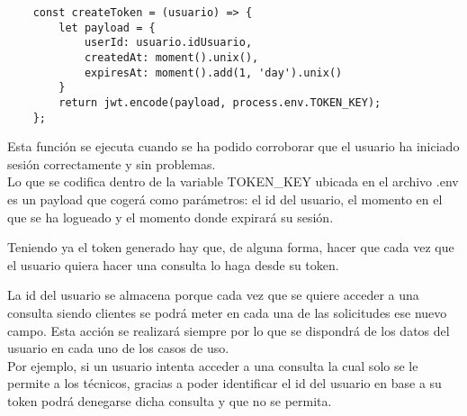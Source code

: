 \begin{verbatim}
    const createToken = (usuario) => {
        let payload = {
            userId: usuario.idUsuario,
            createdAt: moment().unix(),
            expiresAt: moment().add(1, 'day').unix()
        }
        return jwt.encode(payload, process.env.TOKEN_KEY);
    };
\end{verbatim}

Esta función se ejecuta cuando se ha podido corroborar que el usuario ha iniciado sesión correctamente y sin problemas.
\\Lo que se codifica dentro de la variable TOKEN\_KEY ubicada en el archivo .env es un payload que cogerá como parámetros: el id del usuario, el momento en el que se ha logueado y el momento donde expirará su sesión.

Teniendo ya el token generado hay que, de alguna forma, hacer que cada vez que el usuario quiera hacer una consulta lo haga desde su token.

\begin{tcolorbox}
    [colback=green!5!white,colframe=green!75!black,fonttitle=\bfseries,title=¿Por qué se almacena la id del usuario en el payload?]
    La id del usuario se almacena porque cada vez que se quiere acceder a una consulta siendo clientes se podrá meter en cada una de las solicitudes ese nuevo campo. Esta acción se realizará siempre por lo que se dispondrá de los datos del usuario en cada uno de los casos de uso.
    \\Por ejemplo, si un usuario intenta acceder a una consulta la cual solo se le permite a los técnicos, gracias a poder identificar el id del usuario en base a su token podrá denegarse dicha consulta y que no se permita.
\end{tcolorbox}

